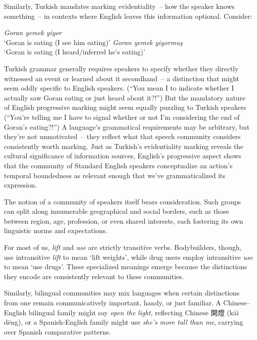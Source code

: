 Similarly, Turkish mandates marking evidentiality~-- how the speaker knows something~-- in contexts where English leaves this information optional. Consider:

\ea
\ea \textit{Goran yemek yiyor}\\`Goran is eating (I see him eating)'
\ex \textit{Goran yemek yiyormuş}\\`Goran is eating (I heard/inferred he's eating)'
\z\z

Turkish grammar generally requires speakers to specify whether they directly witnessed an event or learned about it secondhand~-- a distinction that might seem oddly specific to English speakers. (``You mean I  to indicate whether I actually saw Goran eating or just heard about it?!'') But the mandatory nature of English progressive marking might seem equally puzzling to Turkish speakers (``You're telling me I have to signal whether or not I'm considering the end of Goran's eating?!'') A language's grammatical requirements may be arbitrary, but they're not unmotivated~-- they reflect what that speech community considers consistently worth marking. Just as Turkish's evidentiality marking reveals the cultural significance of information sources, English's progressive aspect shows that the community of Standard English speakers conceptualize an action's temporal boundedness as relevant enough that we've grammaticalized its expression.

The notion of a community of speakers itself bears consideration. Such groups can split along innumerable geographical and social borders, such as those between region, age, profession, or even shared interests, each fostering its own linguistic norms and expectations.

For most of us, \textit{lift} and \textit{use} are strictly transitive verbs. Bodybuilders, though, use intransitive \textit{lift} to mean `lift weights', while drug users employ intransitive \textit{use} to mean `use drugs'. These specialized meanings emerge because the distinctions they encode are consistently relevant to these communities. 

Similarly, bilingual communities may mix languages when certain distinctions from one remain communicatively important, handy, or just familiar. A Chinese--English bilingual family might say \textit{open the light}, reflecting Chinese 開燈 (kāi dēng), or a Spanish-English family might use \textit{she's more tall than me}, carrying over Spanish comparative patterns.

